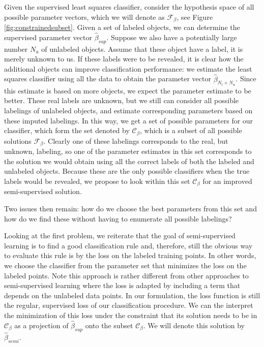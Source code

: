 \documentclass[smallcondensed]{svjour3}
\begin{document}
Given the supervised least squares classifier, consider the hypothesis space of all possible parameter vectors, which we will denote as $\mathcal{F}_{\beta}$, see Figure \ref{fig:constrainedsubset}. Given a set of labeled objects, we can determine the supervised parameter vector $\hat{\beta}_{sup}$. Suppose we also have a potentially large number $N_u$ of unlabeled objects. Assume that these object have a label, it is merely unknown to us. If these labels were to be revealed, it is clear how the additional objects can improve classification performance: we estimate the least squares classifier using all the data to obtain the parameter vector $\hat{\beta}_{N_l+N_u}$. Since this estimate is based on more objects, we expect the parameter estimate to be better. These real labels are unknown, but we still can consider all possible labelings of unlabeled objects, and estimate corresponding parameters based on these imputed labelings. In this way, we get a set of possible parameters for our classifier, which form the set denoted by $\mathcal{C}_{\beta}$, which is a subset of all possible solutions $\mathcal{F}_{\beta}$. Clearly one of these labelings corresponds to the real, but unknown, labeling, so one of the parameter estimates in this set corresponds to the solution we would obtain using all the correct labels of both the labeled and unlabeled objects. Because these are the only possible classifiers when the true labels would be revealed, we propose to look within this set $\mathcal{C}_{\beta}$ for an improved semi-supervised solution. 

Two issues then remain: how do we choose the best parameters from this set and how do we find these without having to enumerate all possible labelings?

Looking at the first problem, we reiterate that the goal of semi-supervised learning is to find a good classification rule and, therefore, still the obvious way to evaluate this rule is by the loss on the labeled training points. In other words, we choose the classifier from the parameter set that minimizes the loss on the labeled points. Note this approach is rather different from other approaches to semi-supervised learning where the loss is adapted by including a term that depends on the unlabeled data points. In our formulation, the loss function is still the regular, supervised loss of our classification procedure. We can the interpret the minimization of this loss under the constraint that its solution needs to be in $\mathcal{C}_{\beta}$ as a projection of $\hat{\beta}_{sup}$ onto the subset $\mathcal{C}_{\beta}$. We will denote this solution by $\hat{\beta}_{semi}$.
\end{document}
